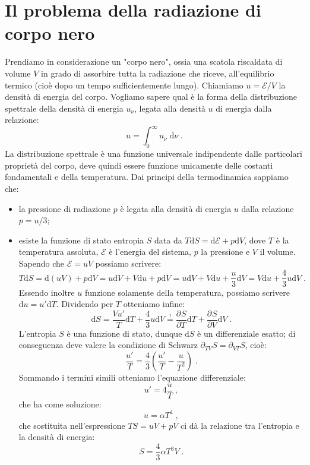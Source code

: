 \documentclass[12pt,a4paper]{report}
\theoremstyle{definition}
\newcommand{\pdev}[3][]{\frac{\partial^{#1} #2}{\partial #3^{#1}}}
\numberwithin{equation}{section}
\newcommand{\diff}[1][]{\mathrm{d}#1}
\begin{document}
\section{Il problema della radiazione di corpo nero}
Prendiamo in considerazione un "corpo nero", ossia una scatola riscaldata di volume $V$ in grado di assorbire tutta la radiazione che riceve, all'equilibrio termico (cioè dopo un tempo sufficientemente lungo). Chiamiamo $u= \mathcal{E}/V$ la densità di energia del corpo. Vogliamo sapere qual è la forma della distribuzione spettrale della densità di energia $u_{\nu}$, legata alla densità $u$ di energia dalla relazione:
\begin{equation}
u=\int_0^{\infty} u_{\nu}\;\diff{\nu}\;.
\end{equation}
La distribuzione spettrale è una funzione universale indipendente dalle particolari proprietà del corpo, deve quindi essere funzione unicamente delle costanti fondamentali e della temperatura. Dai principi della termodinamica sappiamo che:
\begin{itemize}
\item la pressione di radiazione $p$ è legata alla densità di energia $u$ dalla relazione $p=u/3$;
\item esiste la funzione di stato entropia $S$ data da $T\diff{S}=\diff{\mathcal{E}}+p\diff{V}$, dove $T$ è la temperatura assoluta, $\mathcal{E}$ è l'energia del sistema, $p$ la pressione e $V$ il volume. Sapendo che $\mathcal{E}=uV$ possiamo scrivere:
$$
T\diff{S}=\diff{(uV)}+p\diff{V}=u\diff{V}+V\diff{u}+p\diff{V}=u\diff{V}+V\diff{u}+\frac{u}{3}\diff{V}=V\diff{u}+\frac{4}{3}u\diff{V}\;.
$$
Essendo inoltre $u$ funzione solamente della temperatura, possiamo scrivere $\diff{u}=u'\diff{T}$. Dividendo per $T$ otteniamo infine:
$$
\diff{S}=\frac{Vu'}{T}\diff{T}+\frac{4}{3}u\diff{V}\stackrel{!}{=}\pdev{S}{T}\diff{T}+\pdev{S}{V}\diff{V}\;.
$$
L'entropia $S$ è una funzione di stato, dunque $\diff{S}$ è un differenziale esatto; di conseguenza deve valere la condizione di Schwarz $\partial_{TV}S=\partial_{VT}S$, cioè:
$$
\frac{u'}{T}=\frac{4}{3}\left(\frac{u'}{T}-\frac{u}{T^2}\right)\;.
$$
Sommando i termini simili otteniamo l'equazione differenziale:
\begin{equation}
u'=4\frac{u}{T}\;,
\end{equation}
che ha come soluzione:
\begin{equation}
u=\alpha T^4\;,
\end{equation}
che sostituita nell'espressione $TS=uV+pV$ ci dà la relazione tra l'entropia e la densità di energia:
\begin{equation}
S=\frac{4}{3}\alpha T^3 V\;.
\end{equation}
\end{itemize}
\end{document}

